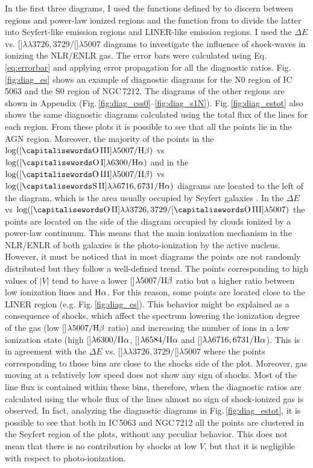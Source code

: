 \documentclass[../main.tex]{subfiles}
\begin{document}
In the first three diagrams, I used the functions defined by \citet{Kewley01} to discern between  regions and power-law ionized regions and the function from \citet{Kewley06} to divide the latter into Seyfert-like emission regions and LINER-like emission regions.
I used the $\Delta E$ vs. []$\lambda\lambda3726,3729/$[]$\lambda5007$ diagrams to investigate the influence of shock-waves in ionizing the NLR/ENLR gas.
The error bars were calculated using Eq.\,\ref{eq:errorbar} and applying error propagation for all the diagnostic ratios.
Fig.\,\ref{fig:diag_es} shows an example of diagnostic diagrams for the N0 region of IC\,5063 and the S0 region of NGC\,7212.
The diagrams of the other regions are shown in Appendix (Fig.\,\ref{fig:diag_css0}--\ref{fig:diag_s1N}).
Fig.\,\ref{fig:diag_estot} also shows the same diagnostic diagrams calculated using the total flux of the lines for each region.
From these plots it is possible to see that all the points lie in the AGN region.
Moreover, the majority of the points in the $\log([\rm\ion{O}{III}]\lambda5007/\Hb)$ vs $\log([\rm\ion{O}{I}]\lambda6300/\Ha)$ and in the $\log([\rm\ion{O}{III}]\lambda5007/\Hb)$ vs $\log([\rm\ion{S}{II}]\lambda\lambda6716,6731/\Ha)$ diagrams are located to the left of the diagram, which is the area usually occupied by Seyfert galaxies \citep{Kewley06}.
In the $\Delta E$ vs $\log([\rm\ion{O}{II}]\lambda\lambda3726,3729/[\rm\ion{O}{III}]\lambda5007)$ the points are located on the side of the diagram occupied by clouds ionized by a power-law continuum.
This means that the main ionization mechanism in the NLR/ENLR of both galaxies is the photo-ionization by the active nucleus.
However, it must be noticed that in most diagrams the points are not randomly distributed but they follow a well-defined trend.
The points corresponding to high values of $\lvert V \lvert$ tend to have a lower []$\lambda5007/\rm H\beta$ ratio but a higher ratio between low ionization lines and $\rm H\alpha$.  
For this reason, some points are located close to the LINER region (e.g. Fig.\,\ref{fig:diag_es}).
This behavior might be explained as a consequence of shocks, which affect the spectrum lowering the ionization degree of the gas (low []$\lambda5007/\rm H\beta$ ratio) and increasing the number of ions in a low ionization state (high []$\lambda6300/\rm H\alpha$, []$\lambda6584/\rm H\alpha$ and []$\lambda\lambda6716,6731/\rm H\alpha$).
This is in agreement with the $\Delta E$ vs. []$\lambda\lambda3726,3729/$[]$\lambda5007$ where the points corresponding to those bins are close to the shocks side of the plot.
Moreover, gas moving at a relatively low speed does not show any sign of shocks.
Most of the line flux is contained within these bins, therefore, when the diagnostic ratios are calculated using the whole flux of the lines almost no sign of shock-ionized gas is observed.
In fact, analyzing the diagnostic diagrams in Fig.\,\ref{fig:diag_estot}, it is possible to see that both in IC\,5063 and NGC\,7212 all the points are clustered in the Seyfert region of the plots, without any peculiar behavior.
This does not mean that there is no contribution by shocks at low $V$, but that it is negligible with respect to photo-ionization. 
\end{document}
